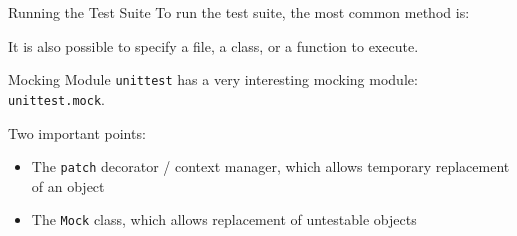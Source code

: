   \begin{frame}{Running the Test Suite}
  To run the test suite, the most common method is:
  
  
  It is also possible to specify a file, a class, or a function to execute.
  \end{frame}
  
  \begin{frame}{Mocking Module}
  \texttt{unittest} has a very interesting mocking module: \texttt{unittest.mock}.
  
  Two important points:
  \begin{itemize}[<+->]
  \item The \texttt{patch} decorator / context manager, which allows temporary replacement of an object
  \item The \texttt{Mock} class, which allows replacement of untestable objects
  \end{itemize}
  \end{frame}